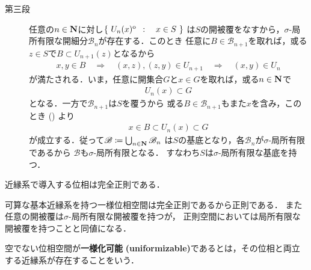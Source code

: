 \begin{prf}
\begin{description}
			\item[第三段]
				任意の$n \in \mathbf{N}$に対し$\left\{\ U_n(x)^{\mathrm{o}}\ \, : \quad x \in S\ \right\}$
				は$S$の開被覆をなすから，$\sigma$-局所有限な開細分$\mathscr{B}_n$が存在する．このとき
				任意に$B \in \mathscr{B}_{n+1}$を取れば，或る$z \in S$で$B \subset U_{n+1}(z)$となるから
				\begin{align}
					x,y \in B \quad\Longrightarrow\quad
					(x,z),(z,y) \in U_{n+1} \quad\Longrightarrow\quad
					(x,y) \in U_n
					\label{eq:thm_if_uniformity_has_countable_base_then_has_topology_has_sigma_locally_finite_base}
				\end{align}
				が満たされる．いま，任意に開集合$G$と$x \in G$を取れば，或る$n \in \mathbf{N}$で
				\begin{align}
					U_n(x) \subset G
				\end{align}
				となる．一方で$\mathscr{B}_{n+1}$は$S$を覆うから
				或る$B \in \mathscr{B}_{n+1}$もまた$x$を含み，このとき
				()
				より
				\begin{align}
					x \in B \subset U_n(x) \subset G
				\end{align}
				が成立する．従って$\mathscr{B} \coloneqq \bigcup_{n \in \mathbf{N}}\mathscr{B}_n$
				は$S$の基底となり，各$\mathscr{B}_n$が$\sigma$-局所有限であるから
				$\mathscr{B}$も$\sigma$-局所有限となる．
				すなわち$S$は$\sigma$-局所有限な基底を持つ．
				\QED
		\end{description}
	\end{prf}
	
	\begin{screen}
		\begin{thm}[一様位相空間は完全正則]
			近縁系で導入する位相は完全正則である．
		\end{thm}
	\end{screen}
	
	\begin{screen}
		\begin{thm}[可算な基本近縁系を持つ一様位相空間はパラコンパクト]
		\end{thm}
	\end{screen}
	
	\begin{prf}
		可算な基本近縁系を持つ一様位相空間は完全正則であるから正則である．
		また任意の開被覆は$\sigma$-局所有限な開被覆を持つが，
		正則空間においては局所有限な開被覆を持つことと同値になる．
		\QED
	\end{prf}
	
	\begin{screen}
		\begin{dfn}[一様化可能]
			空でない位相空間が{\bf 一様化可能}\index{いちようかかのう@一様化可能}
			{\bf (uniformizable)}であるとは，その位相と両立する近縁系が存在することをいう．
		\end{dfn}
	\end{screen}
	
